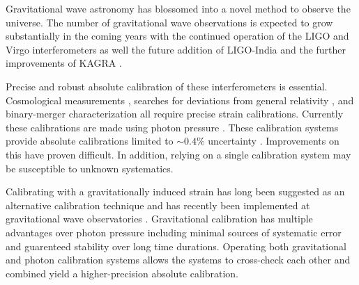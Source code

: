 \documentclass[superscriptaddress, twocolumn, prd]{revtex4-1}
\begin{document}
Gravitational wave astronomy has blossomed into a novel method to observe the universe. The number of gravitational wave observations is expected to grow substantially in the coming years with the continued operation of the LIGO \cite{aLIGO} and Virgo \cite{virgo} interferometers as well the future addition of LIGO-India \cite{ligo-india} and the further improvements of KAGRA \cite{kagra}.

Precise and robust absolute calibration of these interferometers is essential. Cosmological measurements \cite{abbott2021gravitational, ligo2017gravitational, schutz1986determining}, searches for deviations from general relativity \cite{abbott2020tests}, and binary-merger characterization \cite{abbott2020population} all require precise strain calibrations. Currently these calibrations are made using photon pressure \cite{PCal}. These calibration systems provide absolute calibrations limited to $\sim0.4\%$ uncertainty \cite{Bhattacharjee_2020}. Improvements on this have proven difficult. In addition, relying on a single calibration system may be susceptible to unknown systematics.

%

Calibrating with a gravitationally induced strain has long been suggested as an alternative calibration technique \cite{hirakawa1980dynamical, kuroda1985experimental, mio1987experimental, astone1991evaluation, astone1998experimental, Matone_2007} and has recently been implemented at gravitational wave observatories \cite{Estevez_2018, estevez2021newtonian, PhysRevD.98.022005, ncal}. Gravitational calibration has multiple advantages over photon pressure including minimal sources of systematic error and guarenteed stability over long time durations. Operating both gravitational and photon calibration systems allows the systems to cross-check each other and combined yield a higher-precision absolute calibration.
\end{document}
